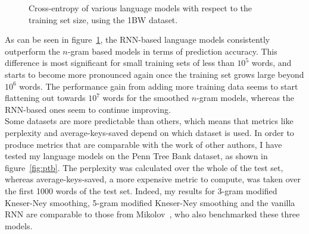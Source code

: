 \documentclass[a4paper, 12pt]{report}
\begin{document}
\begin{figure}[h]
\caption{Cross-entropy of various language models with respect to the training set size, using the 1BW dataset.}
\label{fig:cross_entropy_training_set_size}
\end{figure}

As can be seen in figure~\ref{fig:cross_entropy_training_set_size}, the RNN-based language models consistently outperform the $n$-gram based models in terms of prediction accuracy. This difference is most significant for small training sets of less than $10^5$ words, and starts to become more pronounced again once the training set grows large beyond $10^6$ words. The performance gain from adding more training data seems to start flattening out towards $10^7$ words for the smoothed $n$-gram models, whereas the RNN-based ones seem to continue improving. \\

Some datasets are more predictable than others, which means that metrics like perplexity and average-keys-saved depend on which dataset is used. In order to produce metrics that are comparable with the work of other authors, I have tested my language models on the Penn Tree Bank dataset, as shown in figure~\ref{fig:ptb}. The perplexity was calculated over the whole of the test set, whereas average-keys-saved, a more expensive metric to compute, was taken over the first 1000 words of the test set. Indeed, my results for 3-gram modified Kneser-Ney smoothing, 5-gram modified Kneser-Ney smoothing and the vanilla RNN are comparable to those from Mikolov~\cite{rnn_ptb:mikolov2012}, who also benchmarked these three models. \\
\end{document}
